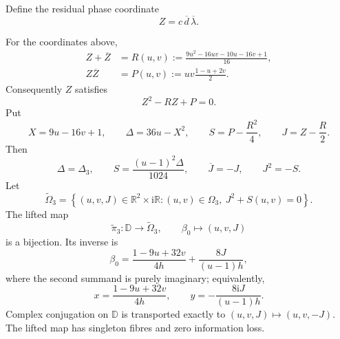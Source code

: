 Define the residual phase coordinate
\begin{equation}
 Z=c\,\overline d\,\overline\lambda.
 \label{eq:n3-Z-definition}
\end{equation}

\begin{theorem}
\label{thm:n3-physical-trace-cover}
For the coordinates above,
\begin{align}
 Z+\overline Z
 &=R(u,v):=\frac{9u^2-16uv-10u-16v+1}{16},
 \label{eq:n3-Z-trace}\\
 Z\overline Z
 &=P(u,v):=uv\frac{1-u+2v}{2}.
 \label{eq:n3-Z-norm}
\end{align}
Consequently $Z$ satisfies
\begin{equation}
 Z^2-RZ+P=0.
 \label{eq:n3-Z-quadratic}
\end{equation}
Put
\begin{equation}
 X=9u-16v+1,\qquad
 \Delta=36u-X^2,\qquad
 S=P-\frac{R^2}{4},\qquad
 J=Z-\frac R2.
 \label{eq:n3-trace-cover-coordinates}
\end{equation}
Then
\begin{equation}
 \Delta=\Delta_3,\qquad
 S=\frac{(u-1)^2\Delta}{1024},\qquad
 \overline J=-J,\qquad J^2=-S.
 \label{eq:n3-trace-cover-relations}
\end{equation}
Let
\begin{equation}
 \widetilde\Omega_3=
 \left\{(u,v,J)\in\mathbb R^2\times\mathrm i\mathbb R:
 (u,v)\in\Omega_3,\ J^2+S(u,v)=0\right\}.
 \label{eq:n3-physical-cover}
\end{equation}
The lifted map
\[
 \widetilde\pi_3:\mathbb D\longrightarrow\widetilde\Omega_3,\qquad
 \beta_0\longmapsto(u,v,J)
\]
is a bijection.  Its inverse is
\begin{equation}
 \beta_0=
 \frac{1-9u+32v}{4h}
 +
 \frac{8J}{(u-1)h},
 \label{eq:n3-lifted-inverse-complex}
\end{equation}
where the second summand is purely imaginary; equivalently,
\begin{equation}
 x=\frac{1-9u+32v}{4h},
 \qquad
 y=-\frac{8\mathrm iJ}{(u-1)h}.
 \label{eq:n3-lifted-inverse-real}
\end{equation}
Complex conjugation on $\mathbb D$ is transported exactly to
$(u,v,J)\mapsto(u,v,-J)$.  The lifted map has singleton fibres and zero
information loss.
\end{theorem}

